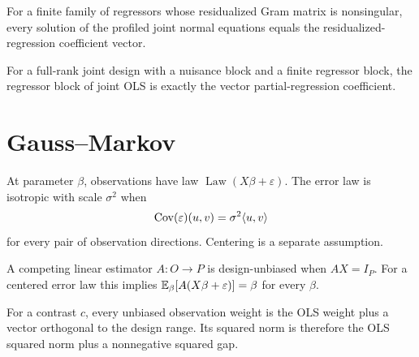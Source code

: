 \begin{theorem}\label{thm:fwl-vector}
For a finite family of regressors whose residualized Gram matrix is nonsingular, every solution of
the profiled joint normal equations equals the residualized-regression coefficient vector.
\leanok
\end{theorem}

\begin{theorem}\label{thm:fwl-partitioned}
For a full-rank joint design with a nuisance block and a finite regressor block, the regressor
block of joint OLS is exactly the vector partial-regression coefficient.
\leanok
\end{theorem}

\chapter{Gauss--Markov}

\begin{definition}\label{def:response-law}
At parameter $\beta$, observations have law $\operatorname{Law}(X\beta+\varepsilon)$.
The error law is isotropic with scale $\sigma^2$ when
\[
 \operatorname{Cov}(\varepsilon)(u,v)=\sigma^2\langle u,v\rangle
\]
for every pair of observation directions.  Centering is a separate assumption.
\leanok
\end{definition}

\begin{definition}\label{def:linear-unbiased}
A competing linear estimator $A:O\to P$ is design-unbiased when $AX=I_P$.  For a centered error
law this implies $\mathbb{E}_\beta[A(X\beta+\varepsilon)]=\beta$ for every $\beta$.
\leanok
\end{definition}

\begin{lemma}\label{lem:contrast-orthogonal}
For a contrast $c$, every unbiased observation weight is the OLS weight plus a vector orthogonal
to the design range.  Its squared norm is therefore the OLS squared norm plus a nonnegative
squared gap.
\leanok
\end{lemma}

